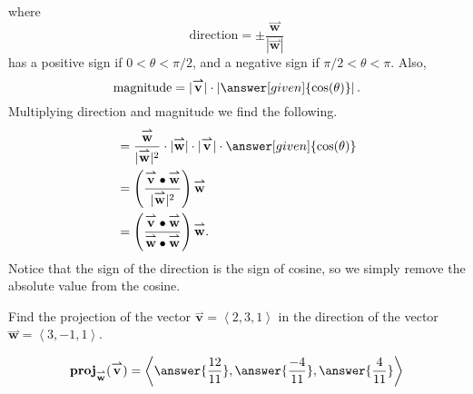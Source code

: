 \documentclass{ximera}
\begin{document}
\begin{theorem}
\begin{explanation}
\[    \]
    where
    \[
    \mathrm{direction} = \pm \frac{\overset{\boldsymbol{\rightharpoonup}}{\mathbf{w}}}{|\overset{\boldsymbol{\rightharpoonup}}{\mathbf{w}}|}
    \]
    has a positive sign if $0<\theta< \pi/2$, and a negative sign if
    $\pi/2< \theta< \pi$. Also,
    \[
    \mathrm{magnitude} = |\overset{\boldsymbol{\rightharpoonup}}{\mathbf{v}}|\cdot\left|\answer[given]{\cos(\theta)}\right|.
    \]
    Multiplying direction and magnitude we find the following.
    \begin{align*}
      &= \frac{\overset{\boldsymbol{\rightharpoonup}}{\mathbf{w}}}{|\overset{\boldsymbol{\rightharpoonup}}{\mathbf{w}}|^2}\cdot |\overset{\boldsymbol{\rightharpoonup}}{\mathbf{w}}|\cdot |\overset{\boldsymbol{\rightharpoonup}}{\mathbf{v}}|\cdot\answer[given]{\cos(\theta)}\\
      &= \left(\frac{\overset{\boldsymbol{\rightharpoonup}}{\mathbf{v}} \bullet \overset{\boldsymbol{\rightharpoonup}}{\mathbf{w}}}{|\overset{\boldsymbol{\rightharpoonup}}{\mathbf{w}}|^2}\right) \overset{\boldsymbol{\rightharpoonup}}{\mathbf{w}}\\
      &=\left(\frac{\overset{\boldsymbol{\rightharpoonup}}{\mathbf{v}} \bullet \overset{\boldsymbol{\rightharpoonup}}{\mathbf{w}}}{\overset{\boldsymbol{\rightharpoonup}}{\mathbf{w}} \bullet \overset{\boldsymbol{\rightharpoonup}}{\mathbf{w}}}\right) \overset{\boldsymbol{\rightharpoonup}}{\mathbf{w}}.
    \end{align*}
    Notice that the sign of the direction is the sign of cosine, so we simply remove the absolute value from the cosine.
  \end{explanation}
\end{theorem}


\begin{question}
  Find the projection of the vector $\overset{\boldsymbol{\rightharpoonup}}{\mathbf{v}} = \left< 2,3,1 \right>$ in the
  direction of the vector $\overset{\boldsymbol{\rightharpoonup}}{\mathbf{w}} = \left< 3,-1,1 \right>$.
  \begin{prompt}
  \[
  \mathbf{proj}_{\overset{\boldsymbol{\rightharpoonup}}{\mathbf{w}}}(\overset{\boldsymbol{\rightharpoonup}}{\mathbf{v}}) = \left< \answer{\frac{12}{11}},\answer{\frac{-4}{11}},\answer{\frac{4}{11}} \right>
  \]
  \end{prompt}
\end{question}
\end{document}
